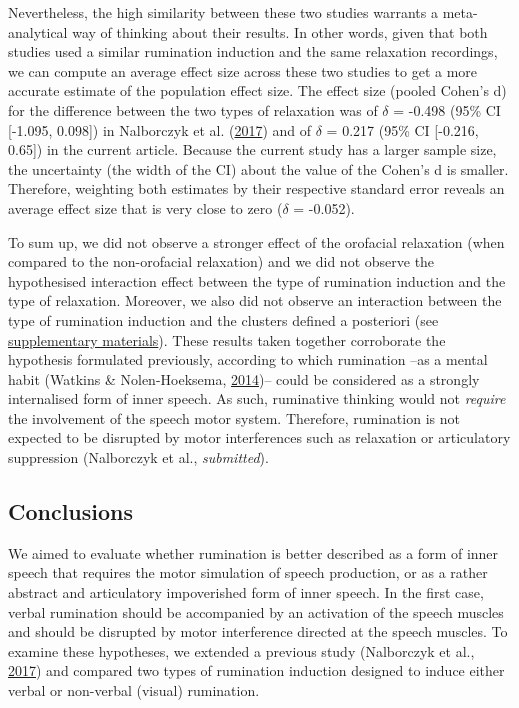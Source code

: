 \documentclass[a4paper,12pt,twoside,openright,oldfontcommands]{memoir}
\begin{document}
Nevertheless, the high similarity between these two studies warrants a meta-analytical way of thinking about their results. In other words, given that both studies used a similar rumination induction and the same relaxation recordings, we can compute an average effect size across these two studies to get a more accurate estimate of the population effect size. The effect size (pooled Cohen's d) for the difference between the two types of relaxation was of \(\delta\) = -0.498 (95\% CI {[}-1.095, 0.098{]}) in Nalborczyk et al. (\protect\hyperlink{ref-nalborczyk_orofacial_2017}{2017}) and of \(\delta\) = 0.217 (95\% CI {[}-0.216, 0.65{]}) in the current article. Because the current study has a larger sample size, the uncertainty (the width of the CI) about the value of the Cohen's d is smaller. Therefore, weighting both estimates by their respective standard error reveals an average effect size that is very close to zero (\(\delta\) = -0.052).

To sum up, we did not observe a stronger effect of the orofacial relaxation (when compared to the non-orofacial relaxation) and we did not observe the hypothesised interaction effect between the type of rumination induction and the type of relaxation. Moreover, we also did not observe an interaction between the type of rumination induction and the clusters defined a posteriori (see \protect\hyperlink{suppCh4}{supplementary materials}). These results taken together corroborate the hypothesis formulated previously, according to which rumination --as a mental habit (Watkins \& Nolen-Hoeksema, \protect\hyperlink{ref-watkins_habit-goal_2014}{2014})-- could be considered as a strongly internalised form of inner speech. As such, ruminative thinking would not \emph{require} the involvement of the speech motor system. Therefore, rumination is not expected to be disrupted by motor interferences such as relaxation or articulatory suppression (Nalborczyk et al., \emph{submitted}).

\hypertarget{conclusions}{%
\subsection{Conclusions}\label{conclusions}}

We aimed to evaluate whether rumination is better described as a form of inner speech that requires the motor simulation of speech production, or as a rather abstract and articulatory impoverished form of inner speech. In the first case, verbal rumination should be accompanied by an activation of the speech muscles and should be disrupted by motor interference directed at the speech muscles. To examine these hypotheses, we extended a previous study (Nalborczyk et al., \protect\hyperlink{ref-nalborczyk_orofacial_2017}{2017}) and compared two types of rumination induction designed to induce either verbal or non-verbal (visual) rumination.
\end{document}

